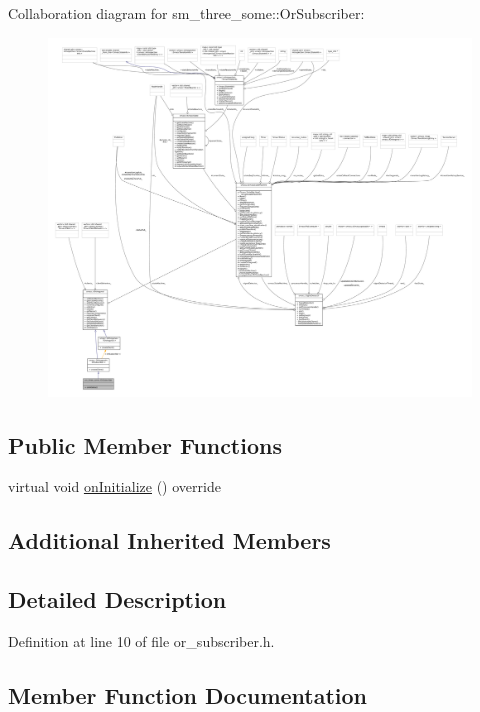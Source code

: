 Collaboration diagram for sm\+\_\+three\+\_\+some\+:\+:Or\+Subscriber\+:
\nopagebreak
\begin{figure}[H]
\begin{center}
\leavevmode
\includegraphics[width=350pt]{classsm__three__some_1_1OrSubscriber__coll__graph}
\end{center}
\end{figure}
\subsection*{Public Member Functions}
\begin{DoxyCompactItemize}
\item 
virtual void \hyperlink{classsm__three__some_1_1OrSubscriber_af1362388fc43c43a38d75542931e348a}{on\+Initialize} () override
\end{DoxyCompactItemize}
\subsection*{Additional Inherited Members}


\subsection{Detailed Description}


Definition at line 10 of file or\+\_\+subscriber.\+h.



\subsection{Member Function Documentation}
